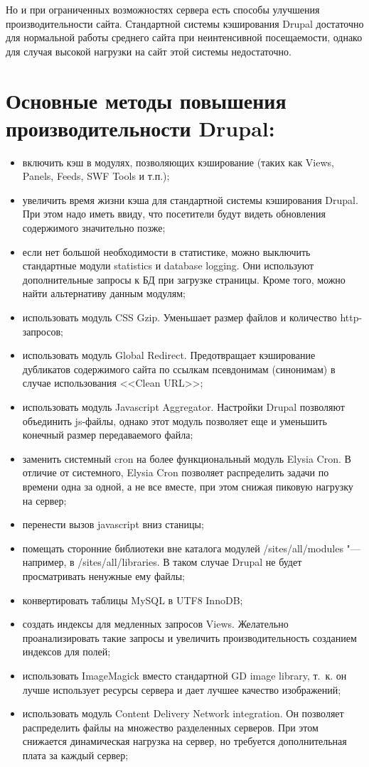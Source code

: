 \documentclass[10pt, a5paper]{article}
\begin{document}
Но и при ограниченных возможностях сервера есть способы улучшения производительности сайта. Стандартной системы кэширования Drupal достаточно для нормальной работы среднего сайта при неинтенсивной посещаемости, однако для случая высокой нагрузки на сайт этой системы недостаточно.

\section*{Основные методы повышения производительности Drupal:}
\begin{itemize}
	\item включить кэш в модулях, позволяющих кэширование (таких как Views, Panels, Feeds, SWF Tools и т.п.);
	\item увеличить время жизни кэша для стандартной системы кэширования Drupal. При этом надо иметь ввиду, что посетители будут видеть обновления содержимого значительно позже;
	\item если нет большой необходимости в статистике, можно выключить стандартные модули statistics и database logging. Они используют дополнительные запросы к БД при загрузке страницы. Кроме того, можно найти альтернативу данным модулям;
	\item использовать модуль CSS Gzip. Уменьшает размер файлов и количество http-запросов;
	\item использовать модуль Global Redirect. Предотвращает кэширование дубликатов содержимого сайта по ссылкам псевдонимам (синонимам) в случае использования <<Clean URL>>;
	\item использовать модуль Javascript Aggregator. Настройки Drupal позволяют объединить js-файлы, однако этот модуль позволяет еще и уменьшить конечный размер передаваемого файла;
	\item заменить системный cron на более функциональный модуль Elysia Cron. В отличие от системного, Elysia Cron позволяет распределить задачи по времени одна за одной, а не все вместе, при этом снижая пиковую нагрузку на сервер;
	\item перенести вызов javascript вниз станицы;
	\item помещать сторонние библиотеки вне каталога модулей \linebreak /sites/all/modules "--- например, в /sites/all/libraries. В таком \linebreak случае Drupal не будет просматривать ненужные ему файлы;
	\item конвертировать таблицы MySQL в UTF8 InnoDB;
	\item создать индексы для медленных запросов Views. Желательно проанализировать такие запросы и увеличить производительность созданием индексов для полей;
	\item использовать ImageMagick вместо стандартной GD image \linebreak library, т.~к. он лучше использует ресурсы сервера и дает лучшее качество изображений;
	\item использовать модуль Content Delivery Network integration. Он позволяет распределить файлы на множество разделенных серверов. При этом снижается динамическая нагрузка на сервер, но требуется дополнительная плата за каждый сервер;
\end{itemize}
\end{document}
